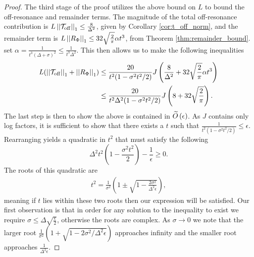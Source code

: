 \begin{proof}
 The third stage of the proof utilizes the above bound on $L$ to bound the  off-resonance and remainder terms. The magnitude of the total off-resonance contribution is $L \left| \left| \mathcal{T}_{\rm off} \right| \right|_1 \le \frac{8 }{\Delta^2}$, given by Corollary \ref{cor:t_off_norm}, and the remainder term is $L \left| \left| R_{\Phi} \right| \right|_1 \le 32 \sqrt{\frac{2}{\pi}} \alpha t^3$, from Theorem \ref{thm:remainder_bound}. 
 set $\alpha = \frac{1}{t^3(\Delta + \sigma)^2} \le \frac{1}{t^3 \Delta^2}$. This then allows us to make the following inequalities
 \begin{align}
     L(\left| \left| \mathcal{T}_{\rm off} \right| \right|_1 + \left| \left| R_{\Phi} \right| \right|_1) &\le \frac{20}{t^2(1 - \sigma^2 t^2 / 2)}J \left( \frac{8}{\Delta^2} + 32 \sqrt{\frac{2}{\pi}} \alpha t^3 \right) \\
    &\le \frac{20}{t^2 \Delta^2 (1 - \sigma^2 t^2 / 2)}J \left( 8 + 32 \sqrt{\frac{2}{\pi}}\right). \label{eq:single_qubit_tmp_2}
 \end{align}
The last step is then to show the above is contained in $\widetilde{O} \left( \epsilon \right)$. As $J$ contains only log factors, it is sufficient to show that there exists a $t$ such that $\frac{1}{t^2(1 - \sigma^2 t^2 / 2)} \le \epsilon$. Rearranging yields a quadratic in $t^2$ that must satisfy the following
\begin{equation}
    \Delta^2 t^2 \left(1 - \frac{\sigma^2 t^2}{2}\right) - \frac{1}{\epsilon} \ge 0. \label{eq:single_qubit_tmp_3}
\end{equation}
The roots of this quadratic are
\begin{align}
    t^2 = \frac{1}{\sigma^2}\left(1 \pm \sqrt{1 - \frac{2 \sigma^2}{\Delta^2 \epsilon}} \right),
\end{align}
meaning if $t$ lies within these two roots then our expression will be satisfied. Our first observation is that in order for any solution to the inequality to exist we require $\sigma \le \Delta \sqrt{\frac{\epsilon}{2}}$, otherwise the roots are complex. As $\sigma \to 0$ we note that the larger root $\frac{1}{\sigma^2}(1 + \sqrt{1 - 2 \sigma^2 / \Delta^2 \epsilon})$ approaches infinity and the smaller root approaches $\frac{1}{\Delta^2 \epsilon}$.


\end{proof}
